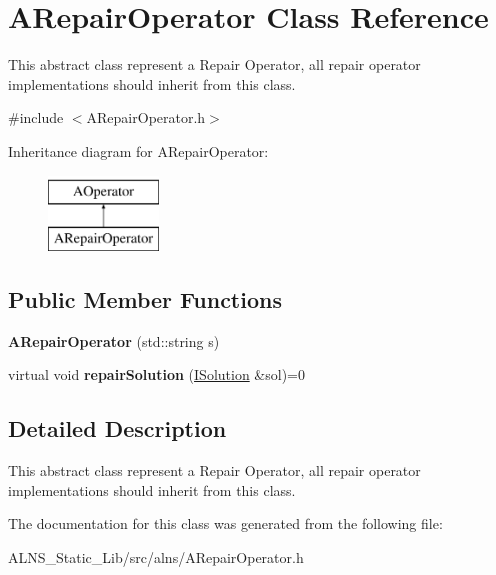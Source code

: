 \hypertarget{classARepairOperator}{\section{\-A\-Repair\-Operator \-Class \-Reference}
\label{classARepairOperator}
}


\-This abstract class represent a \-Repair \-Operator, all repair operator implementations should inherit from this class.  




{\ttfamily \#include $<$\-A\-Repair\-Operator.\-h$>$}

\-Inheritance diagram for \-A\-Repair\-Operator\-:\begin{figure}[H]
\begin{center}
\leavevmode
\includegraphics[height=2.000000cm]{classARepairOperator}
\end{center}
\end{figure}
\subsection*{\-Public \-Member \-Functions}
\begin{DoxyCompactItemize}
\item 
\hypertarget{classARepairOperator_a89708148ed12ce96048911c8b1c54a4c}{{\bfseries \-A\-Repair\-Operator} (std\-::string s)}\label{classARepairOperator_a89708148ed12ce96048911c8b1c54a4c}

\item 
\hypertarget{classARepairOperator_a0192890e73c77197ae8591991169cdca}{virtual void {\bfseries repair\-Solution} (\hyperlink{classISolution}{\-I\-Solution} \&sol)=0}\label{classARepairOperator_a0192890e73c77197ae8591991169cdca}

\end{DoxyCompactItemize}


\subsection{\-Detailed \-Description}
\-This abstract class represent a \-Repair \-Operator, all repair operator implementations should inherit from this class. 

\-The documentation for this class was generated from the following file\-:\begin{DoxyCompactItemize}
\item 
\-A\-L\-N\-S\-\_\-\-Static\-\_\-\-Lib/src/alns/\-A\-Repair\-Operator.\-h\end{DoxyCompactItemize}
